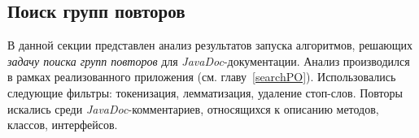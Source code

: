 



\subsection{Поиск групп повторов}
В данной секции представлен анализ результатов запуска алгоритмов, решающих  \emph{задачу поиска групп повторов} для \emph{JavaDoc}-документации.
Анализ производился в рамках реализованного приложения (см. главу~\ref{searchPO}).
Использовались следующие фильтры: токенизация, лемматизация, удаление стоп-слов.
Повторы искались среди \emph{JavaDoc}-комментариев, относящихся к описанию методов, классов, интерфейсов.

